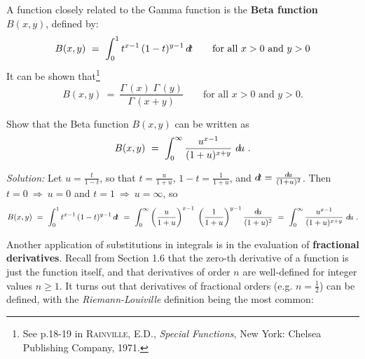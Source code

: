 A function closely related to the Gamma function is the \textbf{Beta function}
$B(x,y)$, defined by:
\begin{equation}
B(x,y) ~=~ \int_0^1 t^{x-1}\,(1-t)^{y-1}\,d\!t \qquad\text{for all $x > 0$ and $y > 0$}
\end{equation}
It can be shown that\footnote{See p.18-19 in \textsc{Rainville, E.D.},
\emph{Special Functions}, New York: Chelsea Publishing Company, 1971.}
\begin{equation}\label{eqn:betagamma}
B(x,y) ~=~ \frac{\Gamma\,(x)\;\Gamma\,(y)}{\Gamma\,(x+y)}
\qquad\text{for all $x > 0$ and $y > 0$.}
\end{equation}
\begin{exmp}\label{exmp:intbeta1}
\noindent Show that the Beta function $B(x,y)$ can be written as
\[
B(x,y) ~=~ \int_0^{\infty} \frac{u^{x-1}}{(1+u)^{x+y}}~d\!u ~.
\]
\par\noindent\emph{Solution:} Let $u=\frac{t}{1-t}$, so that $t=\frac{u}{1+u}$,
$1-t=\frac{1}{1+u}$, and $d\!t = \frac{d\!u}{(1+u)^2}$. Then $t=0~\Rightarrow~u=0$
and $t=1~\Rightarrow~u=\infty$, so
\[
B(x,y) ~=~ \int_0^1 t^{x-1}\,(1-t)^{y-1}\,d\!t
~=~ \int_0^{\infty} \left(\frac{u}{1+u}\right)^{x-1}\;\left(\frac{1}{1+u}\right)^{y-1}
    \frac{d\!u}{(1+u)^2}
~=~ \int_0^{\infty} \frac{u^{x-1}}{(1+u)^{x+y}}~d\!u ~.
\]
\end{exmp}
\divider
\newpage
Another application of substitutions in integrals is in the evaluation of
\textbf{fractional derivatives}. Recall from
Section 1.6 that the zero-th derivative of a function is just the function
itself, and that derivatives of order $n$ are well-defined for integer values
$n \ge 1$. It turns out that derivatives of fractional orders (e.g.
$n=\frac{1}{2}$) can
be defined, with the \emph{Riemann-Louiville} definition being the most
common:


